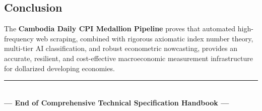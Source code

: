 \documentclass[11pt,a4paper,oneside]{article}
\begin{document}
\subsection{Conclusion}
The \textbf{Cambodia Daily CPI Medallion Pipeline} proves that automated high-frequency web scraping, combined with rigorous axiomatic index number theory, multi-tier AI classification, and robust econometric nowcasting, provides an accurate, resilient, and cost-effective macroeconomic measurement infrastructure for dollarized developing economies.

\vspace{1.5cm}
\begin{center}
\rule{0.6\textwidth}{0.4pt}\\
\vspace{0.4cm}
\textbf{--- End of Comprehensive Technical Specification Handbook ---}
\end{center}
\end{document}

